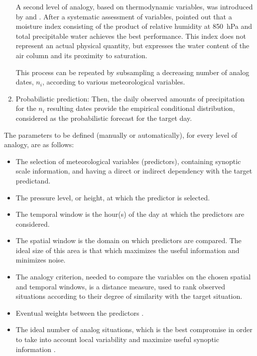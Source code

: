 \documentclass{ametsoc}
\begin{document}
\begin{enumerate}
	A second level of analogy, based on thermodynamic variables, was introduced by \citet{Vallee1986} and \citet{Gibergans-Baguena2007}. After a systematic assessment of variables, \citet{Bontron2004} pointed out that a moisture index consisting of the product of relative humidity at 850~hPa and total precipitable water achieves the best performance. This index does not represent an actual physical quantity, but expresses the water content of the air column and its proximity to saturation.
	
	This process can be repeated by subsampling a decreasing number of analog dates, $n_{i}$, according to various meteorological variables.
	
	\item Probabilistic prediction: Then, the daily observed amounts of precipitation for the $n_{i}$ resulting dates provide the empirical conditional distribution, considered as the probabilistic forecast for the target day.
	
\end{enumerate}

The parameters to be defined (manually or automatically), for every level of analogy, are as follows:

\begin{itemize}
	\item The selection of meteorological variables (predictors), containing synoptic scale information, and having a direct or indirect dependency with the target predictand.
	\item The pressure level, or height, at which the predictor is selected.
	\item The temporal window is the hour(s) of the day at which the predictors are considered.
	\item The spatial window is the domain on which predictors are compared. The ideal size of this area is that which maximizes the useful information and minimizes noise.
	\item The analogy criterion, needed to compare the variables on the chosen spatial and temporal windows, is a distance measure, used to rank observed situations according to their degree of similarity with the target situation.
	\item Eventual weights between the predictors \cite[e.g.,][]{Horton2012a, Junk2015}.
	\item The ideal number of analog situations, which is the best compromise in order to take into account local variability and maximize useful synoptic information \citep{Bontron2004}.
\end{itemize}
\end{document}
